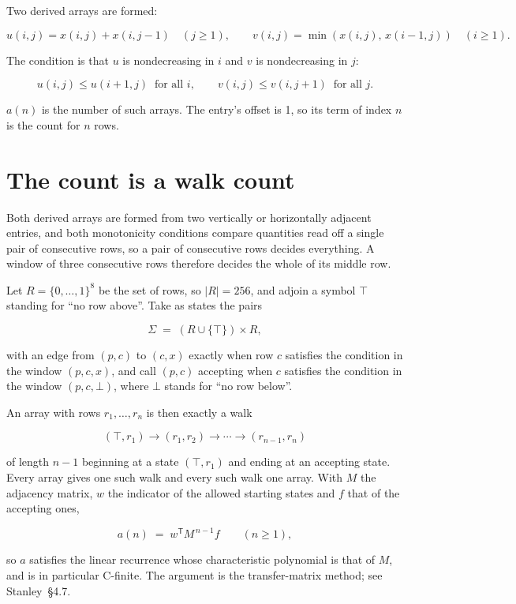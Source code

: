 \documentclass[11pt]{article}
\theoremstyle{definition}
\begin{document}
Two derived arrays are formed:

\[u(i,j) = x(i,j) + x(i,j{-}1)\quad (j \ge 1), \qquad v(i,j) = \min(x(i,j),\,x(i{-}1,j))\quad (i \ge 1).\]

The condition is that $u$ is nondecreasing in $i$ and $v$ is nondecreasing in $j$:

\[u(i,j) \le u(i{+}1,j) \ \text{ for all } i, \qquad v(i,j) \le v(i,j{+}1) \ \text{ for all } j.\]

$a(n)$ is the number of such arrays. The entry's offset is 1, so its term of index $n$ is the count for $n$ rows.

\section{The count is a walk count}

Both derived arrays are formed from two vertically or horizontally adjacent entries, and both monotonicity conditions compare quantities read off a single pair of consecutive rows, so a pair of consecutive rows decides everything. A window of three consecutive rows therefore decides the whole of its middle row.

Let $R = \{0,\dots,1\}^{8}$ be the set of rows, so $|R| = 256$, and adjoin a symbol $\top$ standing for ``no row above''. Take as states the pairs

\[\Sigma \;=\; (R \cup \{\top\}) \times R,\]

with an edge from $(p,c)$ to $(c,x)$ exactly when row $c$ satisfies the condition in the window $(p,c,x)$, and call $(p,c)$ accepting when $c$ satisfies the condition in the window $(p,c,\bot)$, where $\bot$ stands for ``no row below''.

An array with rows $r_1,\dots,r_n$ is then exactly a walk

\[(\top,r_1) \to (r_1,r_2) \to \cdots \to (r_{n-1},r_n)\]

of length $n-1$ beginning at a state $(\top,r_1)$ and ending at an accepting state. Every array gives one such walk and every such walk one array. With $M$ the adjacency matrix, $w$ the indicator of the allowed starting states and $f$ that of the accepting ones,

\[a(n) \;=\; w^{\mathsf T} M^{\,n-1} f \qquad (n \ge 1),\]

so $a$ satisfies the linear recurrence whose characteristic polynomial is that of $M$, and is in particular C-finite. The argument is the transfer-matrix method; see Stanley~\S4.7.
\end{document}
